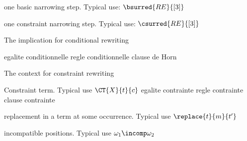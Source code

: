          {one basic narrowing step. Typical use:  $\bsurred{RE}{[3]}$}

         {one constraint narrowing step. Typical use:  $\csurred{RE}{[3]}$}




         {The implication for conditional rewriting}

         {egalite conditionnelle}
         {regle conditionnelle}
         {clause de Horn}


         {The context for constraint rewriting}

         {Constraint term. Typical use $\CT{X}{t}{c}$}
         {egalite contrainte}
         {regle contrainte}
         {clause contrainte}



         {replacement in a term at some occurrence. 
          Typical use $\replace{t}{m}{t'}$}

         {incompatible positions. Typical use $\omega_1 \incomp \omega_2$}


